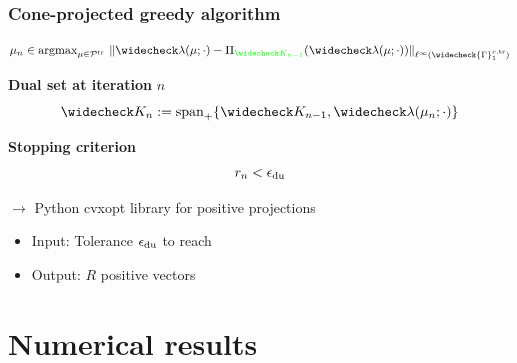 \documentclass[a4paper,10pt]{beamer}
\newcommand\gr[1]{\textcolor{green} {#1} }
\newcommand\bl[1]{\textcolor{blue} {#1} }
\newcommand\ma[1]{\textcolor{royalmagenta} {#1} }
\begin{document}
\begin{frame}
 \frametitle{Cone-projected greedy algorithm}
\begin{center}
\begin{tcolorbox}[title = Selection criterion, halign title = center, colback=blue!5,colframe=black!50!cyan,width = .8\linewidth]
\vspace{-.4cm}$$\mu_n\in
{\mathrm{argmax}}_{\mu \in\mathcal P^{\mathrm{tr}}}\ \| \widecheck\lambda(\mu;\cdot)-\Pi_{\gr{\widecheck K_{n-1}}}(\widecheck\lambda(\mu;\cdot))\|_{\ell^\infty(\widecheck{\Gamma}_{1}^{c,{\rm tr}})}$$
\end{tcolorbox}
\end{center}
\begin{center}
{\bfseries Dual set at iteration} $n$
\gr{$$\widecheck K_n := {\rm span}_+\{\widecheck K_{n-1},\widecheck\lambda(\mu_{n};\cdot)\}$$
}

{\bfseries Stopping criterion} 
\bl{$$r_n<\epsilon_{\rm du}$$}
\end{center}
\vspace{-.6cm}
$\rightarrow$ Python {cvxopt} library for positive projections
\medskip

  \begin{itemize}
\item Input: Tolerance \ma{$\epsilon_{\rm du}$}to reach {\Large\dSmiley}
 \item Output: $R$ positive vectors
\end{itemize}
\end{frame}




\section{Numerical results}
\end{document}
